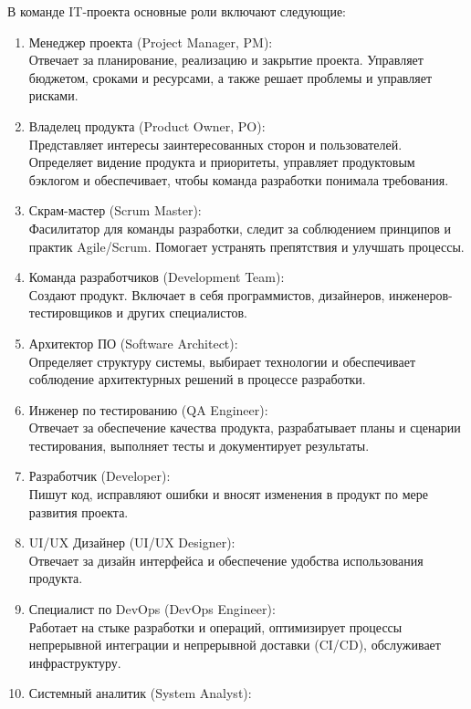     В команде IT-проекта основные роли включают следующие:
    \begin{enumerate}
        \item Менеджер проекта (Project Manager, PM): \\
            Отвечает за планирование, реализацию и закрытие проекта. Управляет бюджетом, сроками и ресурсами, а также решает проблемы и управляет рисками.
        \item Владелец продукта (Product Owner, PO):  \\
            Представляет интересы заинтересованных сторон и пользователей. Определяет видение продукта и приоритеты, управляет продуктовым бэклогом и обеспечивает, чтобы команда разработки понимала требования.
        \item Скрам-мастер (Scrum Master):  \\
            Фасилитатор для команды разработки, следит за соблюдением принципов и практик Agile/Scrum. Помогает устранять препятствия и улучшать процессы.
        \item Команда разработчиков (Development Team):  \\
            Создают продукт. Включает в себя программистов, дизайнеров, инженеров-тестировщиков и других специалистов.
        \item Архитектор ПО (Software Architect):  \\
            Определяет структуру системы, выбирает технологии и обеспечивает соблюдение архитектурных решений в процессе разработки.
        \item Инженер по тестированию (QA Engineer):  \\
            Отвечает за обеспечение качества продукта, разрабатывает планы и сценарии тестирования, выполняет тесты и документирует результаты.
        \item Разработчик (Developer):  \\
            Пишут код, исправляют ошибки и вносят изменения в продукт по мере развития проекта.
        \item UI/UX Дизайнер (UI/UX Designer):  \\
            Отвечает за дизайн интерфейса и обеспечение удобства использования продукта.
        \item Специалист по DevOps (DevOps Engineer): \\
            Работает на стыке разработки и операций, оптимизирует процессы непрерывной интеграции и непрерывной доставки (CI/CD), обслуживает инфраструктуру.
        \item Системный аналитик (System Analyst): \\

\end{enumerate}
